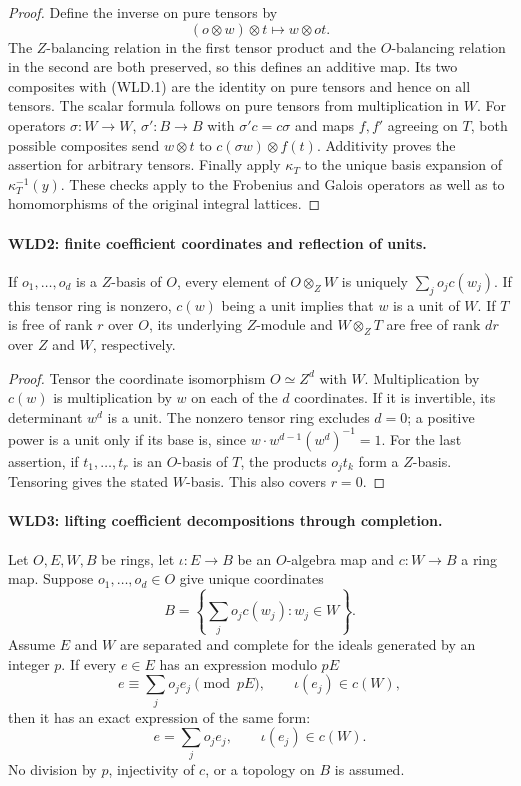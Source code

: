 \documentclass[11pt,a4paper]{article}
\numberwithin{equation}{section}
\theoremstyle{remark}\newtheorem{remark}[theorem]{Remark}
\begin{document}
\begin{proof}
Define the inverse on pure tensors by
\[
             (o\otimes w)\otimes t\longmapsto w\otimes ot.
\]
The $Z$-balancing relation in the first tensor product and the
$O$-balancing relation in the second are both preserved, so this
defines an additive map. Its two composites with (WLD.1) are the
identity on pure tensors and hence on all tensors. The scalar
formula follows on pure tensors from multiplication in $W$.
For operators $\sigma:W\to W$, $\sigma':B\to B$ with
$\sigma'c=c\sigma$ and maps $f,f'$ agreeing on $T$, both possible
composites send $w\otimes t$ to $c(\sigma w)\otimes f(t)$.
Additivity proves the assertion for arbitrary tensors. Finally apply
$\kappa_T$ to the unique basis expansion of $\kappa_T^{-1}(y)$.
These checks apply to the Frobenius and Galois operators as well as
to homomorphisms of the original integral lattices.
\end{proof}

\paragraph{WLD2: finite coefficient coordinates and reflection of units.}
\label{claim:WLD2}
If $o_1,\ldots,o_d$ is a $Z$-basis of $O$, every element of
$O\otimes_ZW$ is uniquely $\sum_j o_jc(w_j)$. If this tensor ring
is nonzero, $c(w)$ being a unit implies that $w$ is a unit of $W$.
If $T$ is free of rank $r$ over $O$, its underlying $Z$-module and
$W\otimes_ZT$ are free of rank $dr$ over $Z$ and $W$, respectively.

\begin{proof}
Tensor the coordinate isomorphism $O\simeq Z^d$ with $W$.
Multiplication by $c(w)$ is multiplication by $w$ on each of the $d$
coordinates. If it is invertible, its determinant $w^d$ is a unit.
The nonzero tensor ring excludes $d=0$; a positive power is a unit
only if its base is, since $w\cdot w^{d-1}(w^d)^{-1}=1$.
For the last assertion, if $t_1,\ldots,t_r$ is an $O$-basis of $T$,
the products $o_jt_k$ form a $Z$-basis. Tensoring gives the stated
$W$-basis. This also covers $r=0$.
\end{proof}

\paragraph{WLD3: lifting coefficient decompositions through completion.}
\label{claim:WLD3}
Let $O,E,W,B$ be rings, let $\iota:E\to B$ be an $O$-algebra map
and $c:W\to B$ a ring map. Suppose $o_1,\ldots,o_d\in O$ give
unique coordinates
\[
                       B=\left\{\sum_j o_jc(w_j):w_j\in W\right\}.
\]
Assume $E$ and $W$ are separated and complete for the ideals generated
by an integer $p$. If every $e\in E$ has an expression modulo $pE$
\[
 e\equiv\sum_j o_je_j\pmod {pE},\qquad \iota(e_j)\in c(W),
\]
then it has an exact expression of the same form:
\[
                  e=\sum_j o_je_j,\qquad \iota(e_j)\in c(W).
                                                               \tag{WLD.3}
\]
No division by $p$, injectivity of $c$, or a topology on $B$ is assumed.
\end{document}
